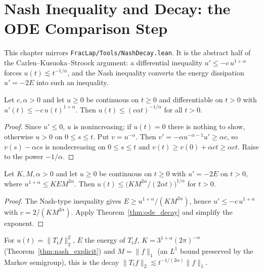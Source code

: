 \chapter{Nash Inequality and Decay: the ODE Comparison Step}

This chapter mirrors \texttt{FracLap/Tools/NashDecay.lean}. It is the abstract half of the Carlen--Kusuoka--Stroock argument: a differential inequality $u' \le -c\, u^{1+\alpha}$ forces $u(t) \lesssim t^{-1/\alpha}$, and the Nash inequality converts the energy dissipation $u' = -2E$ into such an inequality.

\begin{theorem}\label{thm:ode_decay}
\leanok
Let $c, \alpha > 0$ and let $u \ge 0$ be continuous on $t \ge 0$ and differentiable on $t > 0$ with $u'(t) \le -c\, u(t)^{1+\alpha}$. Then $u(t) \le (c \alpha t)^{-1/\alpha}$ for all $t > 0$.
\end{theorem}

\begin{proof}
\leanok
Since $u' \le 0$, $u$ is nonincreasing; if $u(t) = 0$ there is nothing to show, otherwise $u > 0$ on $0 \le s \le t$. Put $v = u^{-\alpha}$. Then $v' = -\alpha u^{-\alpha-1} u' \ge \alpha c$, so $v(s) - \alpha c s$ is nondecreasing on $0 \le s \le t$ and $v(t) \ge v(0) + \alpha c t \ge \alpha c t$. Raise to the power $-1/\alpha$.
\end{proof}

\begin{theorem}\label{thm:nash_decay}
\leanok
Let $K, M, \alpha > 0$ and let $u \ge 0$ be continuous on $t \ge 0$ with $u' = -2E$ on $t > 0$, where $u^{1+\alpha} \le K E M^{2\alpha}$. Then $u(t) \le \bigl(K M^{2\alpha}/(2\alpha t)\bigr)^{1/\alpha}$ for $t > 0$.
\end{theorem}

\begin{proof}
\leanok
The Nash-type inequality gives $E \ge u^{1+\alpha}/(K M^{2\alpha})$, hence $u' \le -c\, u^{1+\alpha}$ with $c = 2/(K M^{2\alpha})$. Apply Theorem~\ref{thm:ode_decay} and simplify the exponent.
\end{proof}

For $u(t) = \lVert T_t f\rVert_2^2$, $E$ the energy of $T_t f$, $K = 3^{1+\alpha}(2\pi)^{-\alpha}$ (Theorem~\ref{thm:nash_explicit}) and $M = \lVert f\rVert_1$ (an $L^1$ bound preserved by the Markov semigroup), this is the decay $\lVert T_t f\rVert_2 \lesssim t^{-1/(2\alpha)} \lVert f\rVert_1$.
